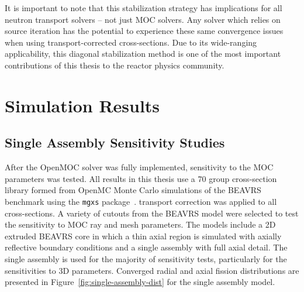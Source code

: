 \documentclass[12pt,twoside]{mitthesis-exec}
\begin{document}
It is important to note that this stabilization strategy has implications for all neutron transport solvers -- not just MOC solvers. Any solver which relies on source iteration has the potential to experience these same convergence issues when using transport-corrected cross-sections. Due to its wide-ranging applicability, this diagonal stabilization method is one of the most important contributions of this thesis to the reactor physics community. 


\section*{Simulation Results}

\subsection*{Single Assembly Sensitivity Studies}

After the OpenMOC solver was fully implemented, sensitivity to the MOC parameters was tested. All results in this thesis use a 70 group cross-section library formed from OpenMC Monte Carlo simulations of the BEAVRS benchmark using the \texttt{mgxs} package~\cite{boyd2017thesis}.  transport correction was applied to all cross-sections. A variety of cutouts from the BEAVRS model were selected to test the sensitivity to MOC ray and mesh parameters. The models include a 2D extruded BEAVRS core in which a thin axial region is simulated with axially reflective boundary conditions and a single assembly with full axial detail. The single assembly is used for the majority of sensitivity tests, particularly for the sensitivities to 3D parameters. Converged radial and axial fission distributions are presented in Figure~\ref{fig:single-assembly-dist} for the single assembly model.
\end{document}
